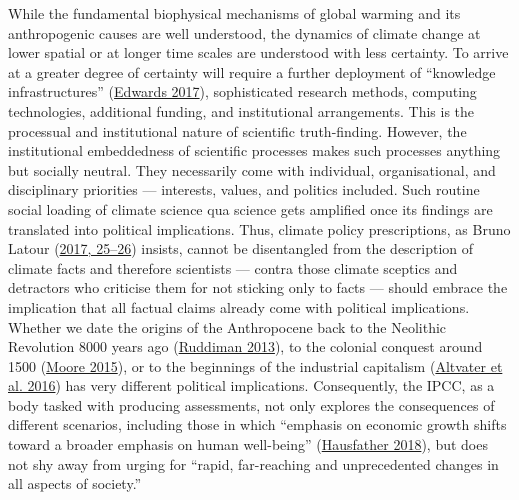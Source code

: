 \documentclass[a4paper, nobind]{templates/ociamthesis}
\begin{document}
While the fundamental biophysical mechanisms of global warming and its anthropogenic causes are well understood, the dynamics of climate change at lower spatial or at longer time scales are understood with less certainty. To arrive at a greater degree of certainty will require a further deployment of ``knowledge infrastructures'' (\protect\hyperlink{ref-edwards_knowledge_2017}{Edwards 2017}), sophisticated research methods, computing technologies, additional funding, and institutional arrangements. This is the processual and institutional nature of scientific truth-finding. However, the institutional embeddedness of scientific processes makes such processes anything but socially neutral. They necessarily come with individual, organisational, and disciplinary priorities --- interests, values, and politics included. Such routine social loading of climate science qua science gets amplified once its findings are translated into political implications. Thus, climate policy prescriptions, as Bruno Latour (\protect\hyperlink{ref-latour_facing_2017}{2017, 25--26}) insists, cannot be disentangled from the description of climate facts and therefore scientists --- contra those climate sceptics and detractors who criticise them for not sticking only to facts --- should embrace the implication that all factual claims already come with political implications. Whether we date the origins of the Anthropocene back to the Neolithic Revolution 8000 years ago (\protect\hyperlink{ref-ruddiman_anthropocene_2013}{Ruddiman 2013}), to the colonial conquest around 1500 (\protect\hyperlink{ref-moore_capitalism_2015}{Moore 2015}), or to the beginnings of the industrial capitalism (\protect\hyperlink{ref-altvater_anthropocene_2016}{Altvater et al. 2016}) has very different political implications. Consequently, the IPCC, as a body tasked with producing assessments, not only explores the consequences of different scenarios, including those in which ``emphasis on economic growth shifts toward a broader emphasis on human well-being'' (\protect\hyperlink{ref-hausfather_explainer_2018}{Hausfather 2018}), but does not shy away from urging for ``rapid, far-reaching and unprecedented changes in all aspects of society.''
\end{document}
